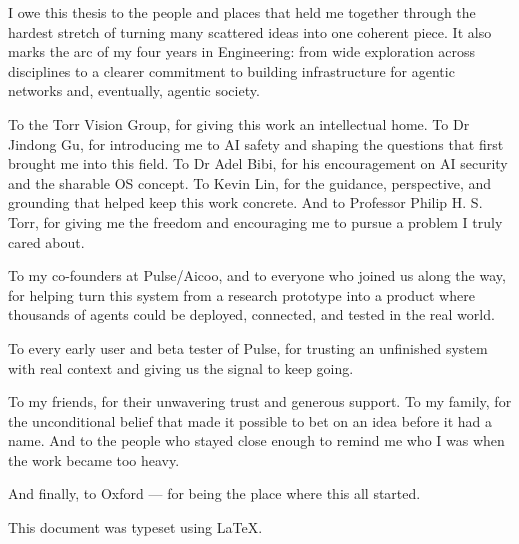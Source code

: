 I owe this thesis to the people and places that held me together through the hardest stretch of turning many scattered ideas into one coherent piece. It also marks the arc of my four years in Engineering: from wide exploration across disciplines to a clearer commitment to building infrastructure for agentic networks and, eventually, agentic society.

To the Torr Vision Group, for giving this work an intellectual home. To Dr Jindong Gu, for introducing me to AI safety and shaping the questions that first brought me into this field. To Dr Adel Bibi, for his encouragement on AI security and the sharable OS concept. To Kevin Lin, for the guidance, perspective, and grounding that helped keep this work concrete. And to Professor Philip H. S. Torr, for giving me the freedom and encouraging me to pursue a problem I truly cared about.

To my co-founders at Pulse/Aicoo, and to everyone who joined us along the way, for helping turn this system from a research prototype into a product where thousands of agents could be deployed, connected, and tested in the real world.

To every early user and beta tester of Pulse, for trusting an unfinished system with real context and giving us the signal to keep going.

To my friends, for their unwavering trust and generous support. To my family, for the unconditional belief that made it possible to bet on an idea before it had a name. And to the people who stayed close enough to remind me who I was when the work became too heavy.

And finally, to Oxford — for being the place where this all started.

\null\vfill
\noindent This document was typeset using \LaTeX.
